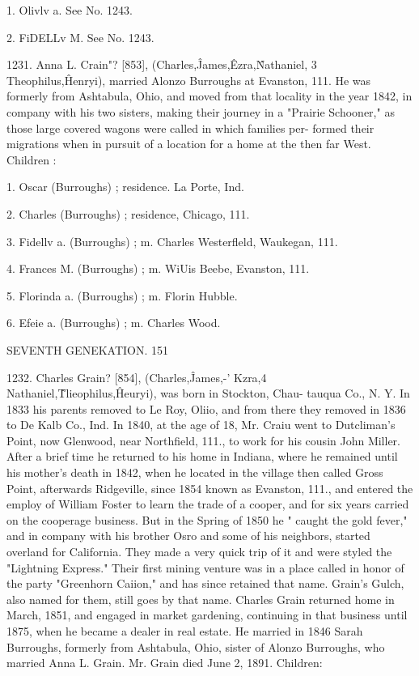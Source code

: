 1. Olivlv a. See No. 1243. 

2. FiDELLv M. See No. 1243. 

1231. Anna L. Crain"? [853], (Charles,\^ James,\^ Ezra,\^ 
Nathaniel, 3 Theophilus,\^ Henryi), married Alonzo Burroughs at 
Evanston, 111. He was formerly from Ashtabula, Ohio, and 
moved from that locality in the year 1842, in company with his 
two sisters, making their journey in a "Prairie Schooner," as 
those large covered wagons were called in which families per- 
formed their migrations when in pursuit of a location for a home 
at the then far West. Children : 

1. Oscar (Burroughs) ; residence. La Porte, Ind. 

2. Charles (Burroughs) ; residence, Chicago, 111. 

3. Fidellv a. (Burroughs) ; m. Charles Westerfleld, Waukegan, 111. 

4. Frances M. (Burroughs) ; m. WiUis Beebe, Evanston, 111. 

5. Florinda a. (Burroughs) ; m. Florin Hubble. 

6. Efeie a. (Burroughs) ; m. Charles Wood. 



SEVENTH GENEKATION. 151 

1232. Charles Grain? [854], (Charles,\^ James,-' Kzra,4 
Nathaniel,\^ Tlieophilus,\^ Heuryi), was born in Stockton, Chau- 
tauqua Co., N. Y. In 1833 his parents removed to Le Roy, Oliio, 
and from there they removed in 1836 to De Kalb Co., Ind. In 
1840, at the age of 18, Mr. Craiu went to Dutcliman's Point, now 
Glenwood, near Northfield, 111., to work for his cousin John Miller. 
After a brief time he returned to his home in Indiana, where he 
remained until his mother's death in 1842, when he located in the 
village then called Gross Point, afterwards Ridgeville, since 1854 
known as Evanston, 111., and entered the employ of William 
Foster to learn the trade of a cooper, and for six years carried 
on the cooperage business. But in the Spring of 1850 he " caught 
the gold fever," and in company with his brother Osro and some 
of his neighbors, started overland for California. They made a 
very quick trip of it and were styled the "Lightning Express." 
Their first mining venture was in a place called in honor of the 
party "Greenhorn Caiion," and has since retained that name. 
Grain's Gulch, also named for them, still goes by that name. 
Charles Grain returned home in March, 1851, and engaged in 
market gardening, continuing in that business until 1875, when 
he became a dealer in real estate. He married in 1846 Sarah 
Burroughs, formerly from Ashtabula, Ohio, sister of Alonzo 
Burroughs, who married Anna L. Grain. Mr. Grain died June 
2, 1891. Children: 


